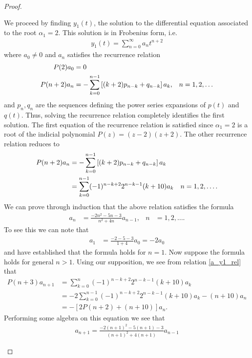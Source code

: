 \documentclass[12pt]{article}
\theoremstyle{definition}
\begin{document}
\begin{proof}
\begin{enumerate}
      We proceed by finding $y_1(t)$, the solution to the differential equation associated to
      the root $\alpha_1 = 2$. This solution is in Frobenius form, i.e.\
      \begin{align}\label{frob_sol}
        y_1(t) = \sum_{n=0}^\infty a_n t^{n+2}
      \end{align}
      where $a_0\neq 0$ and $a_n$ satisfies the recurrence relation
      \begin{align}
        P(2)a_0 &= 0 & & \notag \\
        P(n+2) a_n &= -\sum_{k=0}^{n-1}\left[(k + 2)p_{n-k} + q_{n-k}\right]a_k, &n&=1,2,\dots
      \end{align}
      and $p_n, q_n$ are the sequences defining the power series expansions of $p(t)$ and $q(t)$.
      Thus, solving the recurrence relation completely identifies the first solution.
      The first equation of the recurrence relation is satisfied since $\alpha_1=2$ is a root
      of the indicial polynomial $P(z) = (z-2)(z+2)$. The other recurrence relation
      reduces to
      \begin{align}\label{a_y1_rel}
        P(n+2)a_n &= -\sum_{k=0}^{n-1}\left[(k + 2)p_{n-k} + q_{n-k}\right]a_k & & \notag \\
        &= \sum_{k=0}^{n-1} (-1)^{n-k+2}2^{n-k-1}(k+10)a_k&n&=1,2,\dots.
      \end{align}
      We can prove through induction that the above relation satisfies the formula
      \begin{align*}
        a_n &= \frac{-2n^2-5n-3}{n^2+4n}a_{n-1}, &n&=1,2,\dots.
      \end{align*}
      To see this we can note that
      \begin{align*}
        a_1 &= \frac{-2 - 5 - 3}{1 + 4}a_0 = -2a_0
      \end{align*}
      and have established that the formula holds for $n=1$. Now suppose the formula
      holds for general $n > 1$. Using our supposition, we see from relation \eqref{a_y1_rel} that
      \begin{align*}
        P(n + 3) a_{n+1} &= \sum_{k=0}^{n}(-1)^{n-k+2}2^{n-k-1}(k+10)a_k \\
        &= -2\sum_{k=0}^{n-1}(-1)^{n-k+2}2^{n-k-1}(k+10)a_k - (n+10)a_n \\
        &= -\left[2P(n+2) + (n+10) \right]a_n.
      \end{align*}
      Performing some algebra on this equation we see that
      \begin{align*}
        a_{n+1} = \frac{-2(n+1)^2-5(n+1)-3}{(n+1)^2+4(n+1)}a_{n-1}

\end{align*}
\end{enumerate}
\end{proof}
\end{document}
